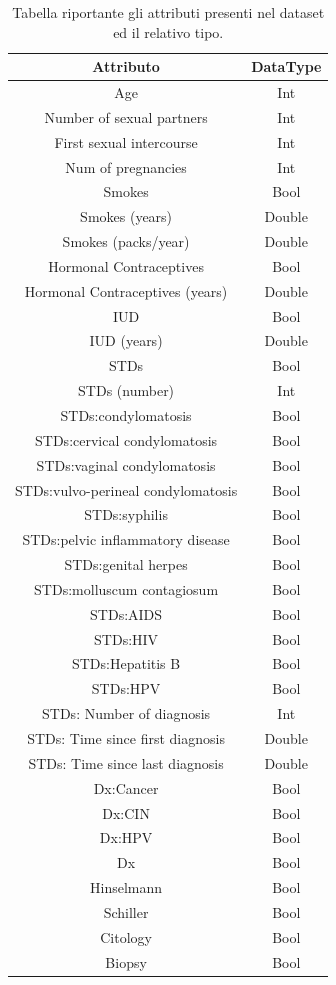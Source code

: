 \begin{table}
	\centering
	\caption{Tabella riportante gli attributi presenti nel dataset ed il relativo tipo.
	}
	\label{tab:attributes}
	\begin{tabular}{|c|c|}
		\toprule 
		Attributo & DataType \\ 
		\midrule 
		Age & Int \\ 
		Number of sexual partners & Int \\ 
		First sexual intercourse & Int \\ 
		Num of pregnancies & Int \\  
		Smokes & Bool \\  
		Smokes (years) & Double \\ 
		Smokes (packs/year) & Double \\ 
		Hormonal Contraceptives & Bool \\ 
		Hormonal Contraceptives (years) & Double \\ 
		IUD & Bool \\ 
		IUD (years) & Double \\ 
		STDs & Bool \\ 
		STDs (number) & Int \\ 
		STDs:condylomatosis & Bool \\ 
		STDs:cervical condylomatosis & Bool \\ 
		STDs:vaginal condylomatosis & Bool \\ 
		STDs:vulvo-perineal condylomatosis & Bool \\ 
		STDs:syphilis & Bool \\ 
		STDs:pelvic inflammatory disease & Bool \\ 
		STDs:genital herpes & Bool \\ 
		STDs:molluscum contagiosum & Bool \\ 
		STDs:AIDS & Bool \\ 
		STDs:HIV & Bool \\ 
		STDs:Hepatitis B & Bool \\ 
		STDs:HPV & Bool \\ 
		STDs: Number of diagnosis & Int \\  
		STDs: Time since first diagnosis & Double \\ 
		STDs: Time since last diagnosis & Double \\ 
		Dx:Cancer & Bool \\ 
		Dx:CIN & Bool \\ 
		Dx:HPV & Bool \\ 
		Dx & Bool \\ 
		Hinselmann & Bool \\ 
		Schiller & Bool \\  
		Citology & Bool \\ 
		Biopsy & Bool \\ 
		\bottomrule 
	\end{tabular} 
\end{table}

